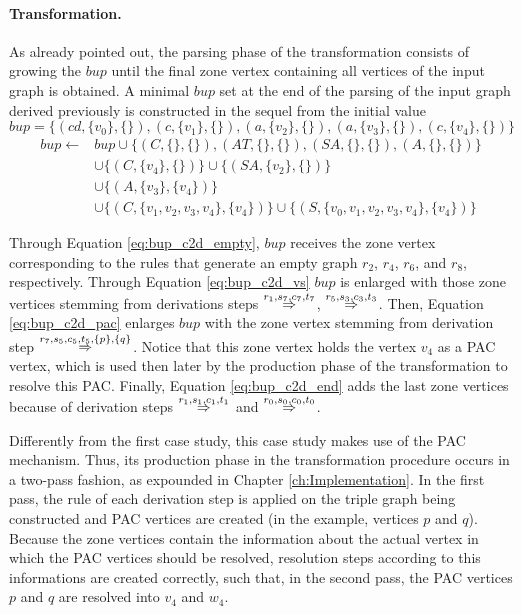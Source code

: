 \paragraph*{Transformation. } As already pointed out, the parsing phase of the transformation consists of growing the $bup$ until the final zone vertex containing all vertices of the input graph is obtained. A minimal $bup$ set at the end of the parsing of the input graph derived previously is constructed in the sequel from the initial value $bup = \{ (cd,\{v_0\},\{\}), (c,\{v_1\},\{\}), (a,\{v_2\},\{\}), (a,\{v_3\},\{\}), (c,\{v_4\},\{\}) \}$
\begin{align}
	\label{eq:bup_c2d_empty}
	bup \gets & bup \cup \{ (C, \{\}, \{\}),(AT, \{\}, \{\}),(SA, \{\}, \{\}),(A, \{\}, \{\}) \} \\
	\label{eq:bup_c2d_vs}
	& \cup \{ (C,\{v_4\}, \{\}) \} \cup \{ (SA,\{v_2\}, \{\}) \} \\
	\label{eq:bup_c2d_pac}
	& \cup \{ (A,\{v_3\}, \{v_4\}) \} \\
	\label{eq:bup_c2d_end}
	& \cup \{ (C,\{v_1,v_2,v_3,v_4\}, \{v_4\}) \} \cup \{ (S,\{v_0,v_1,v_2,v_3,v_4\}, \{v_4\}) \}
\end{align}

Through Equation \ref{eq:bup_c2d_empty}, $bup$ receives the zone vertex corresponding to the rules that generate an empty graph $r_2$, $r_4$, $r_6$, and $r_8$, respectively. Through Equation \ref{eq:bup_c2d_vs} $bup$ is enlarged with those zone vertices stemming from derivations steps $\tderivpac{r_1}{s_7,c_7,t_7}{}{}$, $\tderivpac{r_5}{s_3,c_3,t_3}{}{}$. Then, Equation \ref{eq:bup_c2d_pac} enlarges $bup$ with the zone vertex stemming from derivation step $\tderivpac{r_7}{s_5,c_5,t_5}{\{p\},\{q\}}{}$. Notice that this zone vertex holds the vertex $v_4$ as a PAC vertex, which is used then later by the production phase of the transformation to resolve this PAC. Finally, Equation \ref{eq:bup_c2d_end} adds the last zone vertices because of derivation steps $\tderivpac{r_1}{s_1,c_1,t_1}{}{}$ and $\tderivpac{r_0}{s_0,c_0,t_0}{}{}$.

Differently from the first case study, this case study makes use of the PAC mechanism. Thus, its production phase in the transformation procedure occurs in a two-pass fashion, as expounded in Chapter \ref{ch:Implementation}. In the first pass, the rule of each derivation step is applied on the triple graph being constructed and PAC vertices are created (in the example, vertices $p$ and $q$). Because the zone vertices contain the information about the actual vertex in which the PAC vertices should be resolved, resolution steps according to this informations are created correctly, such that, in the second pass, the PAC vertices $p$ and $q$ are resolved into $v_4$ and $w_4$.


